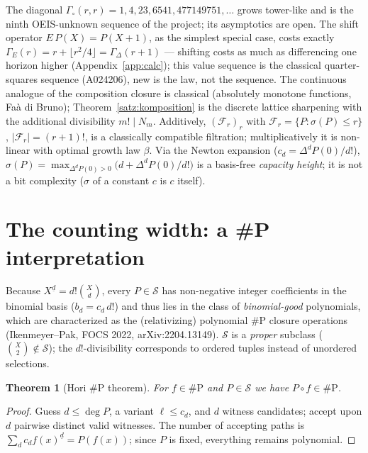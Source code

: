 \documentclass[11pt]{article}
\newtheorem{satz}{Theorem}[section]
\theoremstyle{definition}
\theoremstyle{remark}
\newcommand{\Struk}{\mathcal S}
\begin{document}
The diagonal $\Gamma_\circ(r,r)=1,4,23,6541,477149751,\ldots$
grows tower-like and is the ninth OEIS-unknown sequence of the
project; its asymptotics are open. The shift operator
$E\,P(X)=P(X{+}1)$, as the simplest special case, costs exactly
$\Gamma_E(r)=r+\lfloor r^2/4\rfloor=\Gamma_\Delta(r{+}1)$ ---
shifting costs as much as differencing one horizon higher
(Appendix~\ref{app:calc}); this
value sequence is the classical quarter-squares sequence (A024206),
new is the law, not the sequence. The continuous analogue of the
composition closure is classical (absolutely monotone functions,
Faà di Bruno); Theorem~\ref{satz:komposition} is the discrete
lattice sharpening with the additional divisibility $m!\mid N_m$.
Additively,
$(\mathcal F_r)_r$ with $\mathcal F_r=\{P:\sigma(P)\le r\}$,
$|\mathcal F_r|=(r{+}1)!$, is a classically compatible filtration;
multiplicatively it is non-linear with optimal growth law
$\beta$. Via the Newton expansion ($c_d=\Delta^dP(0)/d!$),
$\sigma(P)=\max_{\Delta^dP(0)>0}\bigl(d+\Delta^dP(0)/d!\bigr)$ is a
basis-free \emph{capacity height}; it is not a bit complexity
($\sigma$ of a constant $c$ is $c$ itself).

\section{The counting width: a \#P interpretation}

Because $X^{\underline d}=d!\binom Xd$, every $P\in\Struk$ has
non-negative integer coefficients in the binomial basis
($b_d=c_d\,d!$) and thus lies in the class of
\emph{binomial-good} polynomials, which are characterized as the
(relativizing) polynomial \#P closure operations
(Ikenmeyer--Pak, FOCS 2022, arXiv:2204.13149). $\Struk$ is a
\emph{proper} subclass ($\binom X2\notin\Struk$); the
$d!$-divisibility corresponds to ordered tuples instead of
unordered selections.

\begin{satz}[Hori \#P theorem]\label{satz:sharpp}
For $f\in\#\mathrm P$ and $P\in\Struk$ we have
$P\circ f\in\#\mathrm P$.
\end{satz}

\begin{proof}
Guess $d\le\deg P$, a variant $\ell\le c_d$, and $d$ witness
candidates; accept upon $d$ pairwise distinct valid witnesses. The
number of accepting paths is
$\sum_d c_d f(x)^{\underline d}=P(f(x))$; since $P$ is fixed,
everything remains polynomial.
\end{proof}
\end{document}

